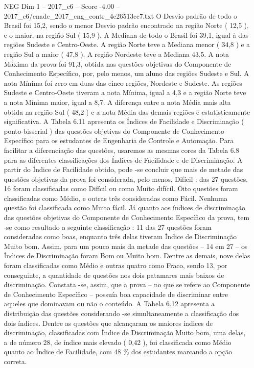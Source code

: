 \begin{textsample}{NEG Dim 1 – 2017\_c6 – Score -4.00 – 2017\_c6/enade\_2017\_eng\_contr\_4e26513cc7.txt}
O Desvio padrão de todo o Brasil foi 15,2, sendo o menor Desvio padrão encontrado na região Norte ( 12,5 ), e o maior, na região Sul ( 15,9 ).
A Mediana de todo o Brasil foi 39,1, igual à das regiões Sudeste e Centro-Oeste.
A região Norte teve a Mediana menor ( 34,8 ) e a região Sul a maior ( 47,8 ).
A região Nordeste teve a Mediana 43,5.
A nota Máxima da prova foi 91,3, obtida nas questões objetivas do Componente de Conhecimento Específico, por, pelo menos, um aluno das regiões Sudeste e Sul.
A nota Mínima foi zero em duas das cinco regiões, Nordeste e Sudeste.
As regiões Sudeste e Centro-Oeste tiveram a nota Mínima, igual a 4,3 e a região Norte teve a nota Mínima maior, igual a 8,7.
A diferença entre a nota Média mais alta obtida na região Sul ( 48,2 ) e a nota Média das demais regiões é estatisticamente significativa.
A Tabela 6.11 apresenta os Índices de Facilidade e Discriminação ( ponto-bisserial ) das questões objetivas do Componente de Conhecimento Específico para os estudantes de Engenharia de Controle e Automação.
Para facilitar a diferenciação das questões, usaremos as mesmas cores da Tabela 6.8 para as diferentes classificações dos Índices de Facilidade e de Discriminação.
A partir do Índice de Facilidade obtido, pode -se concluir que mais de metade das questões objetivas da prova foi considerada, pelo menos, Difícil : das 27 questões, 16 foram classificadas como Difícil ou como Muito difícil.
Oito questões foram classificadas como Médio, e outras três consideradas como Fácil.
Nenhuma questão foi classificada como Muito fácil.
Já quanto aos índices de discriminação das questões objetivas do Componente de Conhecimento Específico da prova, tem -se como resultado a seguinte classificação : 11 das 27 questões foram consideradas como boas, enquanto três delas tiveram Índice de Discriminação Muito bom.
Assim, para um pouco mais da metade das questões – 14 em 27 – os Índices de Discriminação foram Bom ou Muito bom.
Dentre as demais, nove delas foram classificadas como Médio e outras quatro como Fraco, sendo 13, por conseguinte, a quantidade de questões nos dois patamares mais baixos de discriminação.
Constata -se, assim, que a prova – no que se refere ao Componente de Conhecimento Específico – possuía boa capacidade de discriminar entre aqueles que dominavam ou não o conteúdo.
A Tabela 6.12 apresenta a distribuição das questões considerando -se simultaneamente a classificação dos dois índices.
Dentre as questões que alcançaram os maiores índices de discriminação, classificadas com Índice de Discriminação Muito bom, uma delas, a de número 28, de índice mais elevado ( 0,42 ), foi classificada como Médio quanto ao Índice de Facilidade, com 48 \% dos estudantes marcando a opção correta.

\end{textsample}
